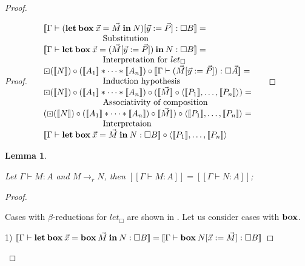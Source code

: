 \documentclass[a4paper]{article}
\newtheorem{lemma}{Lemma}
\begin{document}
\begin{proof}
\begin{proof}
$\begin{array}{lll}
&[\![\Gamma \vdash ({\bf let \: box} \: \vec{x} = \vec{M} {\: \bf in \:} N) [\vec{y} := \vec{P}] : \Box B]\!] =& \\
&\quad\quad\quad\quad\quad\quad\quad \text{Substitution} &\\
&[\![\Gamma \vdash {\bf let \: box} \: \vec{x} = (\vec{M} [\vec{y} := \vec{P}]) {\: \bf in \:} N : \Box B]\!] =& \\
&\quad\quad\quad\quad\quad\quad\quad  \text{Interpretation for $let_{\Box}$} \\
&\boxdot ([\![N]\!]) \circ ([\![A_1]\!] \ast \dots \ast [\![A_n]\!]) \circ [\![\Gamma \vdash (\vec{M} [\vec{y} := \vec{P}]) : \Box \vec{A}]\!] =& \\
&\quad\quad\quad\quad\quad\quad\quad \text{Induction hypothesis}& \\
&\boxdot ([\![N]\!]) \circ ([\![A_1]\!] \ast \dots \ast [\![A_n]\!]) \circ ([\![\vec{M}]\!] \circ \langle [\![P_1]\!],\dots,[\![P_n]\!]\rangle) = & \\
&\quad\quad\quad\quad\quad\quad\quad \text{Associativity of composition}& \\
&(\boxdot ([\![N]\!]) \circ ([\![A_1]\!] \ast \dots \ast [\![A_n]\!]) \circ [\![\vec{M}]\!]) \circ \langle [\![P_1]\!],\dots,[\![P_n]\!]\rangle = & \\
&\quad\quad\quad\quad\quad\quad\quad \text{Interpretaion}& \\
&[\![\Gamma \vdash {\bf let \: box} \: \vec{x} = \vec{M} {\: \bf in \:} N : \Box B]\!] \circ \langle [\![P_1]\!],\dots,[\![P_n]\!]\rangle&
\end{array}$

\end{proof}

\begin{lemma}
  $ $

  Let $\Gamma \vdash M : A$ and $M \to_r N$, then $[\![\Gamma \vdash M : A]\!] = [\![\Gamma \vdash N : A]\!]$;
\end{lemma}

\begin{proof}
  $ $

Cases with $\beta$-reductions for $let_{\Box}$ are shown in \cite{ModalK1}. Let us consider cases with ${\bf box}$.

\vspace{\baselineskip}

1) $[\![\Gamma \vdash {\bf let \: box \:} \vec{x} = {\bf box \:} \vec{M} {\: \bf in \:} N : \Box B]\!] = [\![\Gamma \vdash {\bf box \:} N [\vec{x} := \vec{M}] : \Box B]\!]$


\end{proof}
\end{proof}
\end{document}
